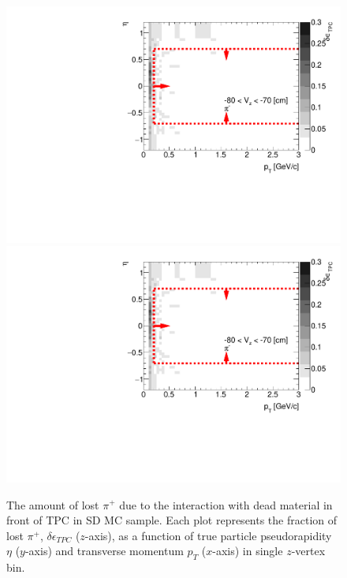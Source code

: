 \begin{figure}[H]
	\caption[The amount of lost $\pi^+$ due to the interaction with dead material in front of TPC as a function of $p_T$, $\eta$ and $z$-vertex in SD]{The amount of lost $\pi^+$ due to the interaction with dead material in front of TPC in SD MC sample. Each plot represents the fraction of lost $\pi^+$, $\delta\epsilon_{ TPC}$ ($z$-axis), as a function of true particle pseudorapidity $\eta$ ($y$-axis) and transverse momentum $p_{T}$ ($x$-axis) in single $z$-vertex bin.}\label{fig:dead_materialSD3Dpip}
	\parbox{0.325\textwidth}{
		\includegraphics[width=\linewidth,page=49]{graphics/systematicsEfficiency/deadMaterial/secondaries_Unbinned_SD_.pdf}\\
		\includegraphics[width=\linewidth,page=52]{graphics/systematicsEfficiency/deadMaterial/secondaries_Unbinned_SD_.pdf}\\
}
\end{figure}
